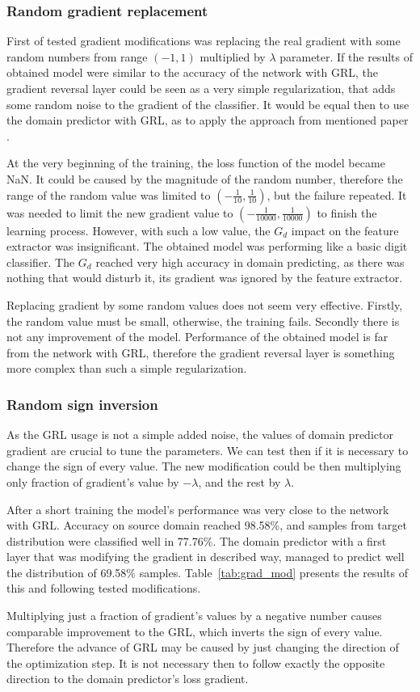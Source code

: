\documentclass{article}
\begin{document}
\subsubsection{Random gradient replacement}
First of tested gradient modifications was replacing the real gradient with some random numbers from range $(-1,1)$ multiplied by $\lambda$ parameter. If the results of obtained model were similar to the accuracy of the network with GRL, the gradient reversal layer could be seen as a very simple regularization, that adds some random noise to the gradient of the classifier. It would be equal then to use the domain predictor with GRL, as to apply the approach from mentioned paper \cite{noise}.
\par
At the very beginning of the training, the loss function of the model became NaN. It could be caused by the magnitude of the random number, therefore the range of the random value was limited to $(-\frac{1}{10}, \frac{1}{10})$, but the failure repeated. It was needed to limit the new gradient value to $(-\frac{1}{10000}, \frac{1}{10000})$ to finish the learning process. However, with such a low value, the $G_{d}$ impact on the feature extractor was insignificant. The obtained model was performing like a basic digit classifier. The $G_{d}$ reached very high accuracy in domain predicting, as there was nothing that would disturb it, its gradient was ignored by the feature extractor.
\par
Replacing gradient by some random values does not seem very effective. Firstly, the random value must be small, otherwise, the training fails. Secondly there is not any improvement of the model. Performance of the obtained model is far from the network with GRL, therefore the gradient reversal layer is something more complex than such a simple regularization. 

\subsubsection{Random sign inversion}
As the GRL usage is not a simple added noise, the values of domain predictor gradient are crucial to tune the parameters. We can test then if it is necessary to change the sign of every value. The new modification could be then multiplying only fraction of gradient's value by $-\lambda$, and the rest by $\lambda$.
\par
After a short training the model's performance was very close to the network with GRL. Accuracy on source domain reached 98.58\%, and samples from target distribution were classified well in 77.76\%. The domain predictor with a first layer that was modifying the gradient in described way, managed to predict well the distribution of 69.58\% samples. Table~\ref{tab:grad_mod} presents the results of this and following tested modifications.
\par
Multiplying just a fraction of gradient's values by a negative number causes comparable improvement to the GRL, which inverts the sign of every value. Therefore the advance of GRL may be caused by just changing the direction of the optimization step. It is not necessary then to follow exactly the opposite direction to the domain predictor's loss gradient. 
\end{document}
